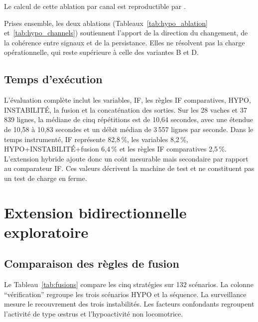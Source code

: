 Le calcul de cette ablation par canal est reproductible par
.

Prises ensemble, les deux ablations (Tableaux~\ref{tab:hypo_ablation} et~\ref{tab:hypo_channels})
soutiennent l'apport
de la direction du changement, de la cohérence entre signaux et de la persistance. Elles ne
résolvent pas la charge opérationnelle, qui reste supérieure à celle des variantes B et D.

\subsection{Temps d'exécution}

L'évaluation complète inclut les variables, IF, les règles IF comparatives, HYPO,
INSTABILITÉ, la fusion et la concaténation des sorties. Sur les 28 vaches et 37\,839 lignes,
la médiane de cinq répétitions est de 10,64 secondes, avec une étendue de 10,58 à 10,83
secondes et un débit médian de 3\,557 lignes par seconde. Dans le temps instrumenté, IF
représente 82,8\,\%, les variables 8,2\,\%, HYPO+INSTABILITÉ+fusion 6,4\,\% et les règles IF
comparatives 2,5\,\%. L'extension hybride ajoute donc un coût mesurable mais secondaire par rapport
au comparateur IF. Ces valeurs décrivent la machine de test et ne constituent pas un test de
charge en ferme.

\section{Extension bidirectionnelle exploratoire}

\subsection{Comparaison des règles de fusion}

Le Tableau~\ref{tab:fusions} compare les cinq stratégies sur 132 scénarios. La colonne
``vérification'' regroupe les trois scénarios HYPO et la séquence. La surveillance mesure le
recouvrement des trois instabilités. Les facteurs confondants regroupent l'activité de type
œstrus et l'hypoactivité non locomotrice.

